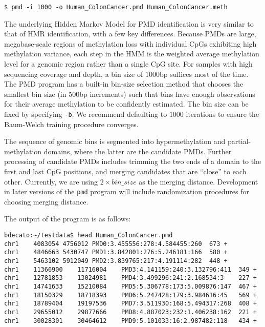 \documentclass[10pt]{article}
\newcommand{\prog}[1]{\texttt{#1}}
\newcommand{\op}[1]{\texttt{#1}}
\begin{document}
\begin{verbatim}
$ pmd -i 1000 -o Human_ColonCancer.pmd Human_ColonCancer.meth
\end{verbatim}

The underlying Hidden Markov Model for PMD identification is very
similar to that of HMR identification, with a few key differences. Because
PMDs are large, megabase-scale regions of methylation loss with
individual CpGs exhibiting high methylation variance, each step in
the HMM is the weighted average methylation level for a genomic region
rather than a single CpG site. For samples with high sequencing coverage
and depth, a bin size of $1000$bp suffices most of the time. The PMD
program has a built-in bin-size selection method that chooses the smallest
bin size (in $500$bp increments) such that bins have enough observations
for their average methylation to be confidently estimated. The bin size
can be fixed by specifying \op{-b}. We recommend defaulting to $1000$
iterations to ensure the Baum-Welch training procedure converges.

The sequence of genomic bins is
segmented into hypermethylation and partial-methylation domains, where
the latter are the candidate PMDs. Further processing of candidate
PMDs includes trimming the two ends of a domain to the first and last
CpG positions, and merging candidates that are ``close'' to each
other. Currently, we are using $2\times bin\_size$ as the merging
distance. Development in later versions of the \prog{pmd} program will
include randomization procedures for choosing merging distance.

The output of the program is as follows:

\begin{verbatim}
bdecato:~/testdata$ head Human_ColonCancer.pmd 
chr1	4083054	4756012	PMD0:3.455556:278:4.584455:260	673	+
chr1	4846663	5430747	PMD1:3.842801:276:5.246181:166	580	+
chr1	5463102	5912049	PMD2:3.839765:217:4.191114:282	448	+
chr1	11366900	11716004	PMD3:4.141159:240:3.132796:411	349	+
chr1	12781853	13024981	PMD4:3.499296:241:2.168534:3	227	+
chr1	14741633	15210084	PMD5:5.306778:173:5.009876:147	467	+
chr1	18150329	18718393	PMD6:5.247428:179:3.984616:45	569	+
chr1	18789404	19197536	PMD7:3.511930:168:5.494317:268	408	+
chr1	29655012	29877666	PMD8:4.887023:232:1.406238:162	221	+
chr1	30028301	30464612	PMD9:5.101033:16:2.987482:118	434	+
\end{verbatim}
\end{document}
